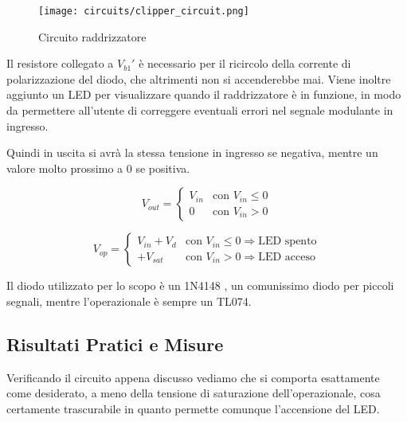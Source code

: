 \begin{figure}[H]
    \centering
    \texttt{[image: circuits/clipper\_circuit.png]}
    \caption{Circuito raddrizzatore}
    \label{clipper_circuit}
\end{figure}

Il resistore collegato a $V_{b1}'$ è necessario per il ricircolo della corrente di
polarizzazione del diodo, che altrimenti non si accenderebbe mai. Viene inoltre aggiunto un
LED per visualizzare quando il raddrizzatore è in funzione, in modo da permettere all'utente
di correggere eventuali errori nel segnale modulante in ingresso.

Quindi in uscita si avrà la stessa tensione in ingresso se negativa, mentre un valore molto
prossimo a $0$ se positiva.

\begin{equation}\label{clipper_out}
    V_{out} =
    \left\{
    \begin{array}{lr}
        V_{in} & \text{con } V_{in}\le0 \\
        0      & \text{con } V_{in}>0
    \end{array}
    \right.
\end{equation}

\begin{equation}\label{clipper_op}
    V_{op} =
    \left\{
    \begin{array}{lr}
        V_{in}+V_d & \text{con } V_{in}\le0\Rightarrow \text{LED spento} \\
        +V_{sat}   & \text{con } V_{in}>0\Rightarrow \text{LED acceso}
    \end{array}
    \right.
\end{equation}

Il diodo utilizzato per lo scopo è un 1N4148 \cite{1n4148}, un comunissimo diodo per piccoli
segnali, mentre l'operazionale è sempre un TL074.


\subsection*{Risultati Pratici e Misure}


Verificando il circuito appena discusso vediamo che si comporta esattamente come desiderato,
a meno della tensione di saturazione dell'operazionale, cosa certamente trascurabile in quanto
permette comunque l'accensione del LED.

